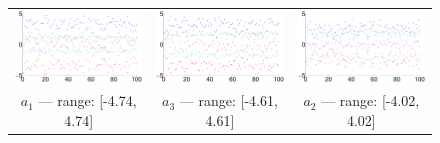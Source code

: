 \begin{figure}[tbh]
\begin{center}
\begin{tabular}{ccc}
\includegraphics[scale=0.14]{fig/clusters.eps} &
\includegraphics[scale=0.14]{fig/clusters4.eps} &
\includegraphics[scale=0.14]{fig/clusters3.eps} \\
$a_1$ --- range: [-4.74, 4.74] & $a_3$ --- range: [-4.61, 4.61] & $a_2$ --- range: [-4.02, 4.02] \\

\end{tabular}
\end{center}
\end{figure}
